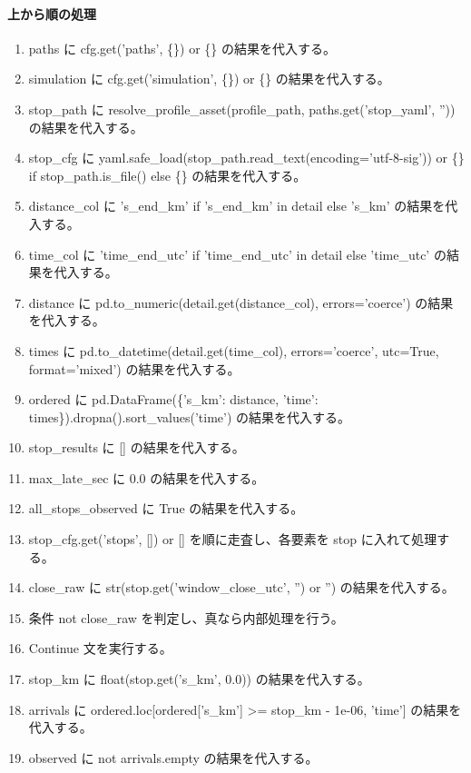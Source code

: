 \documentclass[a4paper,11pt]{article}
\begin{document}
            \paragraph{上から順の処理}
            \begin{enumerate}[leftmargin=1.8em]
            \item paths に cfg.get('paths', \{\}) or \{\} の結果を代入する。
\item simulation に cfg.get('simulation', \{\}) or \{\} の結果を代入する。
\item stop\_path に resolve\_profile\_asset(profile\_path, paths.get('stop\_yaml', '')) の結果を代入する。
\item stop\_cfg に yaml.safe\_load(stop\_path.read\_text(encoding='utf-8-sig')) or \{\} if stop\_path.is\_file() else \{\} の結果を代入する。
\item distance\_col に 's\_end\_km' if 's\_end\_km' in detail else 's\_km' の結果を代入する。
\item time\_col に 'time\_end\_utc' if 'time\_end\_utc' in detail else 'time\_utc' の結果を代入する。
\item distance に pd.to\_numeric(detail.get(distance\_col), errors='coerce') の結果を代入する。
\item times に pd.to\_datetime(detail.get(time\_col), errors='coerce', utc=True, format='mixed') の結果を代入する。
\item ordered に pd.DataFrame(\{'s\_km': distance, 'time': times\}).dropna().sort\_values('time') の結果を代入する。
\item stop\_results に [] の結果を代入する。
\item max\_late\_sec に 0.0 の結果を代入する。
\item all\_stops\_observed に True の結果を代入する。
\item stop\_cfg.get('stops', []) or [] を順に走査し、各要素を stop に入れて処理する。
\item   close\_raw に str(stop.get('window\_close\_utc', '') or '') の結果を代入する。
\item   条件 not close\_raw を判定し、真なら内部処理を行う。
\item     Continue 文を実行する。
\item   stop\_km に float(stop.get('s\_km', 0.0)) の結果を代入する。
\item   arrivals に ordered.loc[ordered['s\_km'] >= stop\_km - 1e-06, 'time'] の結果を代入する。
\item   observed に not arrivals.empty の結果を代入する。

\end{enumerate}
\end{document}

